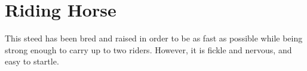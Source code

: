 \section{Riding Horse}

This steed has been bred and raised in order to be as fast as possible while being strong enough to carry up to two riders. However, it is fickle and nervous, and easy to startle.
